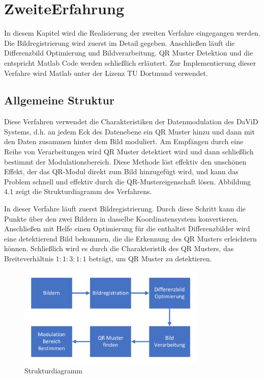 \chapter{ZweiteErfahrung} \label{cha:ZweiteErfahrung}

In diesem Kapitel wird die Realisierung der zweiten Verfahre eingegangen werden. Die Bildregistrierung wird zuerst im Detail gegeben. Anschließen läuft die Differenzbild Optimierung und Bildverarbeitung. QR Muster Detektion und die entspricht Matlab Code werden schließlich erläutert. 
Zur Implementierung dieser Verfahre wird Matlab unter der Lizenz TU Dortmund verwendet.

\section{Allgemeine Struktur} 

Diese Verfahren verwendet die Charakteristiken der Datenmodulation des DaViD Systems, d.h. an jedem Eck des Datenebene ein QR Muster hinzu und dann mit den Daten zusammen hinter dem Bild moduliert. Am Empfängen  durch eine Reihe von Verarbeitungen wird QR Muster detektiert wird und dann schließlich bestimmt der Modulationsbereich. Diese Methode löst effektiv den unschönen Effekt, der das QR-Modul direkt zum Bild hinzugefügt wird, und kann das Problem schnell und effektiv durch die QR-Mustereigenschaft lösen. Abbildung 4.1 zeigt die Strukturdiagramm des Verfahrens.

In dieser Verfahre läuft zuerst Bildregistrierung. Durch diese Schritt kann die Punkte über den zwei Bildern in dasselbe Koordinatensystem konvertieren. Anschließen mit Helfe einen Optimierung für die enthaltet Differenzbilder wird eine detektierend Bild bekommen, die die Erkennung des QR Musters erleichtern können. Schließlich wird es durch die Charakteristik des QR Musters, das Breiteverhältnis $1:1:3:1:1$ beträgt, um QR Muster zu detektieren.

\begin{figure}[htb]
 \centering 
 \includegraphics[keepaspectratio,width=0.8\textwidth]{images/4_ZweiteErfahrung/Flussigdiagramm.pdf}
 \caption{Strukturdiagramm}
 \label{fig:ZeiteVerfahreStrukturdiagramm}
\end{figure}

